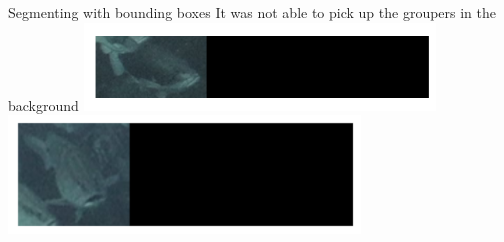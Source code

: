 \begin{frame}{Segmenting with bounding boxes}
    It was not able to pick up the groupers in the background 
    \centering
   \includegraphics[height=0.7\textheight,width=0.7\textwidth,keepaspectratio]{images/gm3-6.png}
   \centering
   \includegraphics[height=0.7\textheight,width=0.7\textwidth,keepaspectratio]{images/gm3-7.png}
   
\end{frame}





